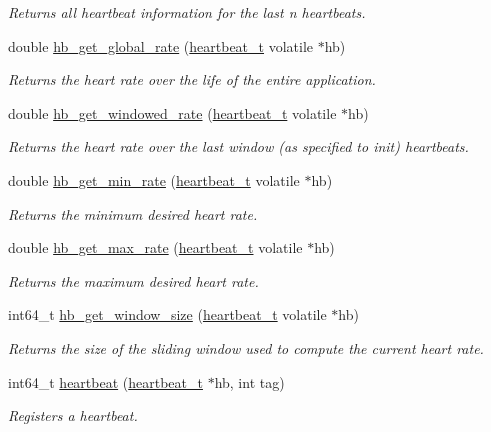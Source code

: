\begin{CompactItemize}
\begin{CompactList}\small\item\em Returns all heartbeat information for the last n heartbeats. \item\end{CompactList}\item 
double \hyperlink{heartbeat-shared_8c_55b60b6aa61bbb71ee099f2e7180540e}{hb\_\-get\_\-global\_\-rate} (\hyperlink{structheartbeat__t}{heartbeat\_\-t} volatile $\ast$hb)
\begin{CompactList}\small\item\em Returns the heart rate over the life of the entire application. \item\end{CompactList}\item 
double \hyperlink{heartbeat-shared_8c_7afb09ea470be506247e69e874127be3}{hb\_\-get\_\-windowed\_\-rate} (\hyperlink{structheartbeat__t}{heartbeat\_\-t} volatile $\ast$hb)
\begin{CompactList}\small\item\em Returns the heart rate over the last window (as specified to init) heartbeats. \item\end{CompactList}\item 
double \hyperlink{heartbeat-shared_8c_96fa03d16ef34067e63860cea57b71db}{hb\_\-get\_\-min\_\-rate} (\hyperlink{structheartbeat__t}{heartbeat\_\-t} volatile $\ast$hb)
\begin{CompactList}\small\item\em Returns the minimum desired heart rate. \item\end{CompactList}\item 
double \hyperlink{heartbeat-shared_8c_566d7911466aa84b09b1cb5c16fd1bb0}{hb\_\-get\_\-max\_\-rate} (\hyperlink{structheartbeat__t}{heartbeat\_\-t} volatile $\ast$hb)
\begin{CompactList}\small\item\em Returns the maximum desired heart rate. \item\end{CompactList}\item 
int64\_\-t \hyperlink{heartbeat-shared_8c_1e6ea5f3c95dd936082274969dba0ee8}{hb\_\-get\_\-window\_\-size} (\hyperlink{structheartbeat__t}{heartbeat\_\-t} volatile $\ast$hb)
\begin{CompactList}\small\item\em Returns the size of the sliding window used to compute the current heart rate. \item\end{CompactList}\item 
int64\_\-t \hyperlink{heartbeat-shared_8c_83cee6dbfb8365b1595ef200f45fe6fc}{heartbeat} (\hyperlink{structheartbeat__t}{heartbeat\_\-t} $\ast$hb, int tag)
\begin{CompactList}\small\item\em Registers a heartbeat. \item\end{CompactList}\end{CompactItemize}


